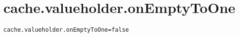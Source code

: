\section{cache.valueholder.onEmptyToOne}
\label{configuration:CacheValueholderOnEmptyToOne}
\ClearAPI
\TODO
{}
\begin{lstlisting}[style=Props,caption={Usage example for \textit{cache.valueholder.onEmptyToOne}}]
cache.valueholder.onEmptyToOne=false
\end{lstlisting}